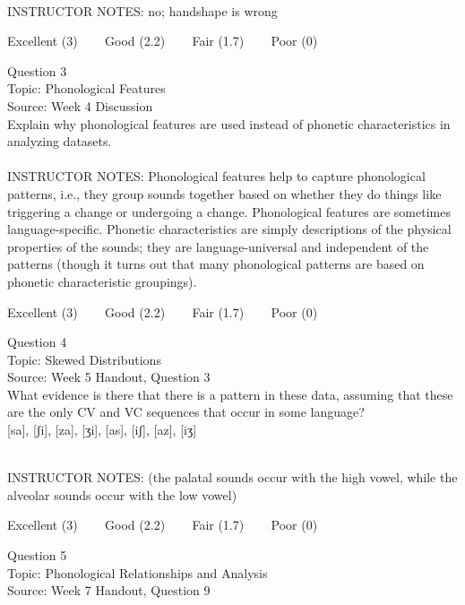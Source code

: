 \documentclass[12pt]{article}
\begin{document}
~\\
INSTRUCTOR NOTES: no; handshape is wrong


\vfill
Excellent (3) ~~~ Good (2.2) ~~~ Fair (1.7) ~~~ Poor (0)
\newpage

{\large Question 3}\\

Topic: Phonological Features\\
Source: Week 4 Discussion\\

Explain why phonological features are used instead of phonetic characteristics in analyzing datasets.\\


~\\
INSTRUCTOR NOTES: Phonological features help to capture phonological patterns, i.e., they group sounds together based on whether they do things like triggering a change or undergoing a change. Phonological features are sometimes language-specific. Phonetic characteristics are simply descriptions of the physical properties of the sounds; they are language-universal and independent of the patterns (though it turns out that many phonological patterns are based on phonetic characteristic groupings).


\vfill
Excellent (3) ~~~ Good (2.2) ~~~ Fair (1.7) ~~~ Poor (0)
\newpage

{\large Question 4}\\

Topic: Skewed Distributions\\
Source: Week 5 Handout, Question 3\\

What evidence is there that there is a pattern in these data, assuming that these are the only CV and VC sequences that occur in some language?\\

{[sa]}, {[ʃi]}, {[za]}, {[ʒi]}, {[as]}, {[iʃ]}, {[az]}, {[iʒ]}


~\\
INSTRUCTOR NOTES: (the palatal sounds occur with the high vowel, while the alveolar sounds occur with the low vowel)


\vfill
Excellent (3) ~~~ Good (2.2) ~~~ Fair (1.7) ~~~ Poor (0)
\newpage

{\large Question 5}\\

Topic: Phonological Relationships and Analysis\\
Source: Week 7 Handout, Question 9\\
\end{document}
